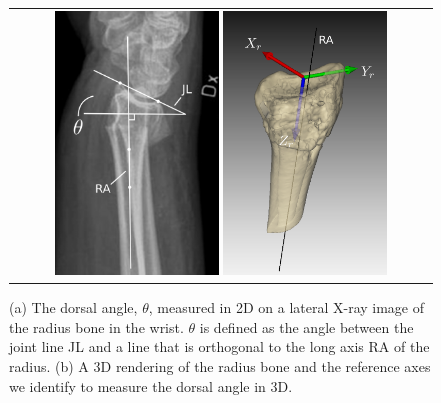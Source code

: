 \begin{enumerate}
\begin{figure}[!htbp]
\centering
\begin{tabular}{c}
\includegraphics[width=0.4\textwidth]{figures/research/wrist_project_figure1a.png}
\vspace*{2mm}
\includegraphics[width=0.4\textwidth]{figures/research/wrist_project_figure1b.png}
\end{tabular}
\caption{\label{fig:wrist} (a) The dorsal angle, $\theta$, measured in 2D on a lateral X-ray image of the radius bone in the wrist. $\theta$ is defined as the angle between the joint line JL and a line that is orthogonal to the long axis RA of the radius. (b) A 3D rendering of the radius bone and the reference axes we identify to measure the dorsal angle in 3D.}
\end{figure}



\end{enumerate}
